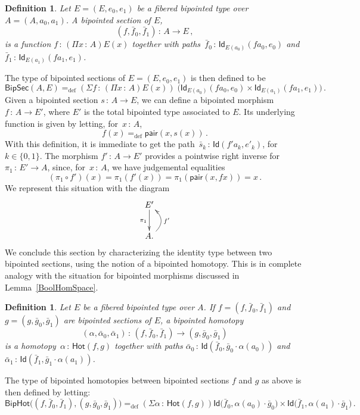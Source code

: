 \documentclass[10pt,a4paper,oneside,reqno]{amsart}
\numberwithin{equation}{section}
\theoremstyle{mythm}
\theoremstyle{mydef}
\newtheorem{definition}[theorem]{Definition}
\theoremstyle{myrmk}
\newcommand{\deq}{=}
\newcommand{\defeq}{=_{\mathrm{def}}}
\newcommand{\co}{\,{:}\,}
\newcommand{\ct}{\cdot}
\newcommand{\Hot}{\mathsf{Hot}}
\newcommand{\Id}{\mathsf{Id}}
\newcommand{\pair}{\mathsf{pair}}
\newcommand{\BipHot}{\mathsf{BipHot}}
\newcommand{\BipSec}{\mathsf{BipSec}}
\begin{document}
\begin{definition} \label{def:fibsection} Let $E = (E, e_0, e_1)$ be a fibered bipointed type over
$A = (A, a_0, a_1)$.  A \emph{bipointed section} of $E$, 
\[
(f, \bar{f}_0, \bar{f}_1) \co A \to E \, ,
\]
is a function $f \co (\Pi x \co A) E(x)$ together with paths~$\bar{f}_0 \co \Id_{E(a_0)}(f a_0, e_0)$ 
and $\bar{f}_1 \co  \Id_{E(a_1)}( f a_1 , e_1)$. 
\end{definition} 


The type of bipointed sections of $E = (E, e_0, e_1)$ is then defined to be
\[
\BipSec(A,E) \defeq (\Sigma f \co (\Pi x \co A)E(x) ) \; \big(
  \Id_{E(a_0)}(f a_0,  e_0)  \times \Id_{E(a_1)}( fa_1, e_1)  \big) \, .
\]
Given a bipointed section $s \co A \to E$, we can define a bipointed morphism~$f  \co A \to E'$, where $E'$ is the
total bipointed type associated to $E$. Its underlying function is given by 
letting,  for~$x \co A$, 
\[
f(x) \defeq \pair(x, s(x)) \, .
\] 
With this definition, it is 
immediate to get the path~$\bar{s}_k \co \Id( f' a_k ,  e'_k)$, for $k \in \{ 0, 1\}$.
The morphism $f' \co A \to E'$ provides a pointwise right inverse for~$\pi_1 \co E' \to A$,
 since, for~$x \co A$, we have judgemental equalities
\[
 (\pi_1 \circ f')(x) \deq \pi_1 (f'(x)) \deq \pi_1 (\pair(x, f x)) \deq x \, .
\]
 We represent this situation with the diagram
\[
\xymatrix{
E' \ar[d]_{\pi_1} \\
A . \ar@/_1.2pc/[u]_{f'} }
\]
We conclude this section by characterizing the identity type between two bipointed sections, using
the notion of a bipointed homotopy. This is in complete analogy with the situation for bipointed
morphisms discussed in Lemma~\ref{BoolHomSpace}. 


\begin{definition} \label{def:2cellsection} Let $E$ be a fibered bipointed type over $A$. If $f = (f, \bar{f}_0,\bar{f}_1)$ and $g = (g, \bar{g}_0, \bar{g}_1)$ are bipointed sections of $E$, a \emph{bipointed homotopy} 
\[
(\alpha, \bar{\alpha}_0, \bar{\alpha}_1) \co (f, \bar{f}_0, \bar{f}_1)  \rightarrow (g, \bar{g}_0, \bar{g}_1)
\]
is a homotopy~$\alpha \co \Hot(f, g)$ together with paths $\bar{\alpha}_0 \co \Id(  \bar{f}_0 ,  \bar{g}_0 \ct \alpha(a_0)  )$ and $\bar{\alpha}_1 \co \Id(
\bar{f}_1 , \bar{g}_1 \ct  \alpha(a_1))$.
\end{definition} 



The type of bipointed homotopies between bipointed sections $f$ and $g$ as above is then defined by letting:
\[
\BipHot \big( (f, \bar{f}_0, \bar{f}_1), (g, \bar{g}_0, \bar{g}_1) \big) \defeq
(\Sigma \alpha \co \Hot( f, g)) 
\Id\big( \bar{f}_0 ,  \alpha(a_0)  \ct \bar{g}_0 \big) \times 
  \Id \big( \bar{f}_1,  \alpha(a_1) \ct  \bar{g}_1 \big) 
 \, .
\]
\end{document}
